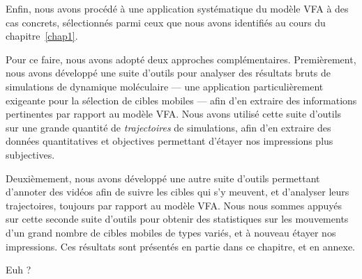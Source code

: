 	Enfin, nous avons procédé à une application systématique du modèle VFA à des cas concrets, sélectionnés parmi ceux que nous avons identifiés au cours du chapitre~\ref{chap1}.
	
	Pour ce faire, nous avons adopté deux approches complémentaires. Premièrement, nous avons développé une suite d'outils pour analyser des résultats bruts de simulations de dynamique moléculaire --- une application particulièrement exigeante pour la sélection de cibles mobiles --- afin d'en extraire des informations pertinentes par rapport au modèle VFA. Nous avons utilisé cette suite d'outils sur une grande quantité de \emph{trajectoires} de simulations, afin d'en extraire des données quantitatives et objectives permettant d'étayer nos impressions plus subjectives.
	
	Deuxièmement, nous avons développé une autre suite d'outils permettant d'annoter des vidéos afin de suivre les cibles qui s'y meuvent, et d'analyser leurs trajectoires, toujours par rapport au modèle VFA. Nous nous sommes appuyés sur cette seconde suite d'outils pour obtenir des statistiques sur les mouvements d'un grand nombre de cibles mobiles de types variés, et à nouveau étayer nos impressions. Ces résultats sont présentés en partie dans ce chapitre, et en annexe.
	
	Euh ?

\clearpage
